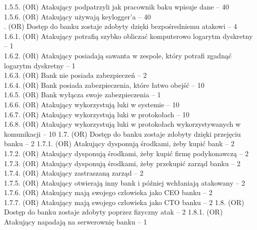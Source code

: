 \documentclass[10pt,a4paper,twoside]{article}
\newenvironment{subs}
{\adjustwidth{3em}{0pt}}
{\endadjustwidth}
\begin{document}
\begin{subs}
\begin{subs}
            1.5.5. (OR) Atakujący podpatrzyli jak pracownik baku wpisuje dane -- 40 \\
            1.5.6. (OR) Atakujący używają keylogger'a -- 40 \\
        \end{subs}
        1.6. (OR) Dostęp do banku zostaje zdobyty dzięki bezpośredniemu atakowi -- 4
        \begin{subs}
            1.6.1. (OR) Atakujący potrafią szybko obliczać komputerowo logarytm dyskretny -- 1 \\
            1.6.2. (OR) Atakujący posiadają sawanta w zespole, który potrafi zgadnąć logarytm dyskretny -- 1 \\
            1.6.3. (OR) Bank nie posiada zabezpieczeń -- 2 \\
            1.6.4. (OR) Bank posiada zabezpieczenia, które łatwo obejść -- 10 \\
            1.6.5. (OR) Bank wyłącza swoje zabezpieczenia -- 1 \\
            1.6.6. (OR) Atakujący wykorzystują luki w systemie -- 10 \\
            1.6.7. (OR) Atakujący wykorzystują luki w protokołach -- 10 \\
            1.6.8. (OR) Atakujący wykorzystują luki w protokołach wykorzystywanych w komunikacji -- 10
        \end{subs}
        1.7. (OR) Dostęp do banku zostaje zdobyty dzięki przejęciu banku -- 2
        \begin{subs}
            1.7.1. (OR) Atakujący dysponują środkami, żeby kupić bank -- 2 \\
            1.7.2. (OR) Atakujący dysponują środkami, żeby kupić firmę podykonawczą -- 2 \\
            1.7.3. (OR) Atakujący dysponują środkami, żeby przekupić zarząd banku -- 2 \\
            1.7.4. (OR) Atakujący zastraszaną zarząd -- 2 \\
            1.7.5. (OR) Atakujący otwierają inny bank i później wchłaniają atakowany -- 2 \\
            1.7.6. (OR) Atakujący mają swojego człowieka jako CEO banku -- 2 \\
            1.7.7. (OR) Atakujący mają swojego człowieka jako CTO banku -- 2
        \end{subs}
        1.8. (OR) Dostęp do banku zostaje zdobyty poprzez fizyczny atak -- 2
        \begin{subs}
            1.8.1. (OR) Atakujący napadają na serwerownię banku -- 1 \\

\end{subs}
\end{subs}
\end{document}
